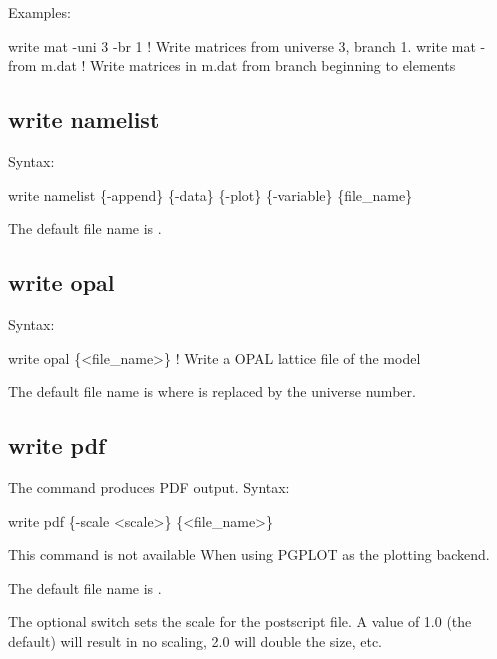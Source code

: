 {{{{{{{{{{{Examples:
\begin{example}
  write mat -uni 3 -br 1  ! Write matrices from universe 3, branch 1.
  write mat -from m.dat   ! Write matrices in m.dat from branch beginning to elements
\end{example}


\subsection{write namelist}
\label{s:write.namelist}

Syntax:
\begin{example}
    write namelist \{-append\} \{-data\} \{-plot\} \{-variable\} \{file_name\}
\end{example}

The default file name is .


\subsection{write opal}
\label{s:write.opal}

Syntax:
\begin{example}
    write opal \{<file_name>\}  ! Write a OPAL lattice file of the model
\end{example}

The default file name is  where \vn{\#} is replaced by the universe number. 


\subsection{write pdf}
\label{s:write.pdf}

The  command produces PDF output. Syntax:
\begin{example}
  write pdf \{-scale <scale>\} \{<file_name>\}
\end{example}
This command is not available When using PGPLOT as the plotting backend.

The default file name is . 

The optional  switch sets the scale for the postscript file. A value of 1.0 (the
default) will result in no scaling, 2.0 will double the size, etc.

}}}}}}}}}}}
